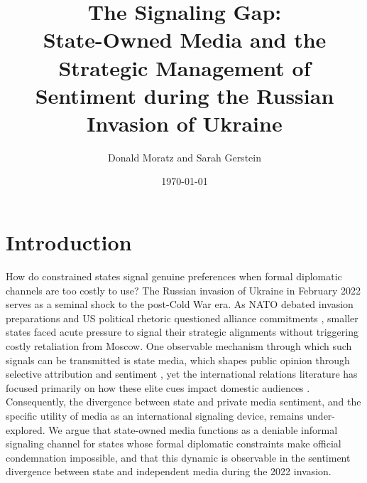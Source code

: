 \documentclass[12pt]{article}
\title{%
  The Signaling Gap: \\
  \large State-Owned Media and the Strategic Management of Sentiment during the Russian Invasion of Ukraine}
\author{Donald Moratz and Sarah Gerstein}
\date{\today}
\begin{document}
\maketitle



\section*{Introduction}

How do constrained states signal genuine preferences when formal diplomatic channels are too costly to use? The Russian invasion of Ukraine in February 2022 serves as a seminal shock to the post-Cold War era. As NATO debated invasion preparations \citep{jakes_for_2024} and US political rhetoric questioned alliance commitments \citep{sanger_outburst_2024}, smaller states faced acute pressure to signal their strategic alignments without triggering costly retaliation from Moscow. One observable mechanism through which such signals can be transmitted is state media, which shapes public opinion through selective attribution and sentiment \citep{guriev_theory_2020, rozenas_how_2019}, yet the international relations literature has focused primarily on how these elite cues impact domestic audiences \citep{guisinger_mapping_2017}. Consequently, the divergence between state and private media sentiment, and the specific utility of media as an international signaling device, remains under-explored. We argue that state-owned media functions as a deniable informal signaling channel for states whose formal diplomatic constraints make official condemnation impossible, and that this dynamic is observable in the sentiment divergence between state and independent media during the 2022 invasion.
\end{document}
